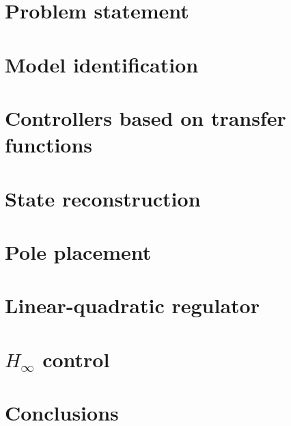 \documentclass{report}
\begin{document}
	\newpage
	
	\tableofcontents
	\chapter{Problem statement}
		
	\chapter{Model identification}
		
	\chapter{Controllers based on transfer functions}
		
	\chapter{State reconstruction}
		
	\chapter{Pole placement}
	  	
	\chapter{Linear-quadratic regulator}
		
	\chapter{\boldmath ${H_{\infty}}$ control}
		
	\chapter{Conclusions}
		
\end{document}

